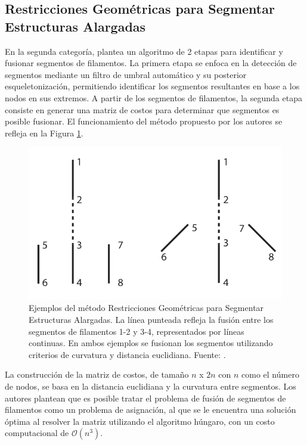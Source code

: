\subsection{Restricciones Geom\'etricas para Segmentar Estructuras Alargadas}
En la segunda categor\'ia, \citet{cerda2014geometrical} plantea un algoritmo de 2 etapas para identificar y fusionar segmentos de filamentos. La primera etapa se enfoca en la detecci\'on de segmentos mediante un filtro de umbral autom\'atico y su posterior esqueletonizaci\'on, permitiendo identificar los segmentos resultantes en base a los nodos en sus extremos. A partir de los segmentos de filamentos, la segunda etapa consiste en generar una matriz de costos para determinar que segmentos es posible fusionar. El funcionamiento del m\'etodo propuesto por los autores se refleja en la Figura \ref{fig:segment-fusion}.

\begin{figure}[h]
        \includegraphics[scale=0.7]{imagenes/mcerda-121.png}
        \caption[Ejemplos del m\'etodo Restricciones Geom\'etricas para Segmentar Estructuras Alargadas.]{Ejemplos del m\'etodo Restricciones Geom\'etricas para Segmentar Estructuras Alargadas. La l\'inea punteada refleja la fusi\'on entre los segmentos de filamentos 1-2 y 3-4, representados por l\'ineas continuas. En ambos ejemplos se fusionan los segmentos utilizando criterios de curvatura y distancia euclidiana. Fuente: \citet{cerda2014geometrical}.}
        \label{fig:segment-fusion}
\end{figure}

La construcci\'on de la matriz de costos, de tamaño $n$ x $2n$ con $n$ como el n\'umero de nodos, se basa en la distancia euclidiana y la curvatura entre segmentos. Los autores plantean que es posible tratar el problema de fusi\'on de segmentos de filamentos como un problema de asignaci\'on, al que se le encuentra una soluci\'on \'optima al resolver la matriz utilizando el algoritmo h\'ungaro, con un costo computacional de $\mathcal{O}{(n^{3})}$.


